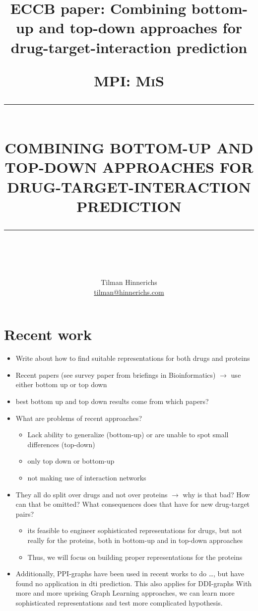 \documentclass[]{article}
\title{ECCB paper: Combining bottom-up and top-down approaches for drug-target-interaction prediction}
\author{Tilman Hinnerichs\\
\href{mailto:tilman@hinnerichs.com}{tilman@hinnerichs.com}}
\date{}
\newcommand{\HRule}[1]{\rule{\linewidth}{#1}}
\begin{document}
	
	\title{ \normalsize \textsc{MPI: MiS}
		\\ [0.5cm]
		\HRule{0.5pt} \\
		\LARGE \textbf{\uppercase{Combining bottom-up and top-down approaches for drug-target-interaction prediction}}
		\HRule{0.5pt} \\ [0.5cm]
		\normalsize }

\maketitle


\section{Recent work}
	\begin{itemize}
		\item Write about how to find suitable representations for both drugs and proteins
		\item Recent papers (see survey paper from briefings in Bioinformatics) $\rightarrow$ use either bottom up or top down
		\item best bottom up and top down results come from which papers?
		\item What are problems of recent approaches?
		\begin{itemize}
			\item Lack ability to generalize (bottom-up) or are unable to spot small differences (top-down)
			\item only top down or bottom-up
			\item not making use of interaction networks
		\end{itemize}
		\item They all do split over drugs and not over proteins $\rightarrow$ why is that bad? How can that be omitted? What consequences does that have for new drug-target pairs? 
		\begin{itemize}
			\item its feasible to engineer sophisticated representations for drugs, but not really for the proteins, both in bottom-up and in top-down approaches
			\item Thus, we will focus on building proper representations for the proteins
		\end{itemize}
		\item Additionally, PPI-graphs have been used in recent works to do \dots, but have found no application in dti prediction. This also applies for DDI-graphs With more and more uprising Graph Learning approaches, we can learn more sophisticated representations and test more complicated hypothesis.
		
	\end{itemize}
\end{document}
